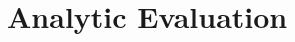 \documentclass[evaluation.tex]{subfiles}
\begin{document}
\section{Analytic Evaluation} %
\label{sec:analytic_evaluation}

\end{document}
